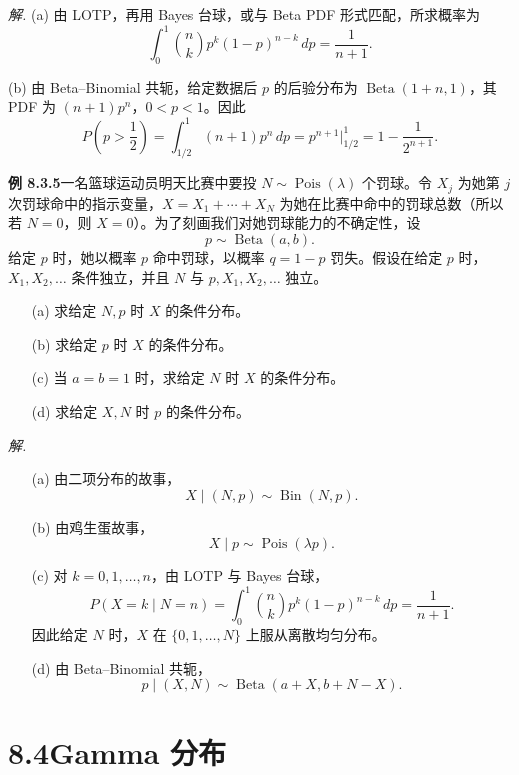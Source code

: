 \documentclass[UTF8, 12pt, fontset=fandol, oneside]{ctexart}
\begin{document}
\noindent\textit{解.}\quad
(a) 由 LOTP，再用 Bayes 台球，或与 Beta PDF 形式匹配，所求概率为
\[
  \int_0^1 {n\choose k}p^k(1-p)^{n-k}\,dp=\frac{1}{n+1}.
\]

(b) 由 Beta--Binomial 共轭，给定数据后 $p$ 的后验分布为 $\operatorname{Beta}(1+n,1)$，其 PDF 为 $(n+1)p^n$，$0<p<1$。因此
\[
  P\left(p>\frac12\right)
  =\int_{1/2}^1 (n+1)p^n\,dp
  =p^{n+1}\bigg|_{1/2}^{1}
  =1-\frac{1}{2^{n+1}}.
\]

\noindent\textbf{例 8.3.5}\quad 一名篮球运动员明天比赛中要投 $N\sim\operatorname{Pois}(\lambda)$ 个罚球。令 $X_j$ 为她第 $j$ 次罚球命中的指示变量，$X=X_1+\cdots+X_N$ 为她在比赛中命中的罚球总数（所以若 $N=0$，则 $X=0$）。为了刻画我们对她罚球能力的不确定性，设
\[
  p\sim\operatorname{Beta}(a,b).
\]
给定 $p$ 时，她以概率 $p$ 命中罚球，以概率 $q=1-p$ 罚失。假设在给定 $p$ 时，$X_1,X_2,\ldots$ 条件独立，并且 $N$ 与 $p,X_1,X_2,\ldots$ 独立。

\begin{enumerate}
  \item[(a)] 求给定 $N,p$ 时 $X$ 的条件分布。
  \item[(b)] 求给定 $p$ 时 $X$ 的条件分布。
  \item[(c)] 当 $a=b=1$ 时，求给定 $N$ 时 $X$ 的条件分布。
  \item[(d)] 求给定 $X,N$ 时 $p$ 的条件分布。
\end{enumerate}

\noindent\textit{解.}\quad
\begin{enumerate}
  \item[(a)] 由二项分布的故事，
  \[
    X\mid(N,p)\sim\operatorname{Bin}(N,p).
  \]

  \item[(b)] 由鸡生蛋故事，
  \[
    X\mid p\sim\operatorname{Pois}(\lambda p).
  \]

  \item[(c)] 对 $k=0,1,\ldots,n$，由 LOTP 与 Bayes 台球，
  \[
    P(X=k\mid N=n)
    =\int_0^1 {n\choose k}p^k(1-p)^{n-k}\,dp
    =\frac{1}{n+1}.
  \]
  因此给定 $N$ 时，$X$ 在 $\{0,1,\ldots,N\}$ 上服从离散均匀分布。

  \item[(d)] 由 Beta--Binomial 共轭，
  \[
    p\mid(X,N)\sim\operatorname{Beta}(a+X,b+N-X).
  \]
\end{enumerate}

\section*{8.4\quad Gamma 分布}
\end{document}
